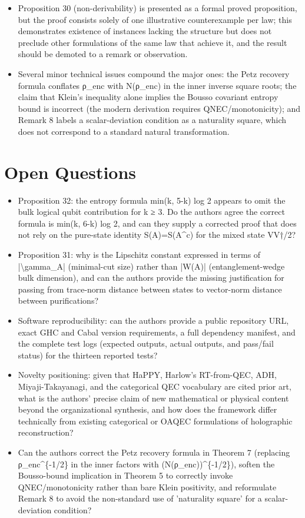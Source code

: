 \documentclass[11pt]{article}
\begin{document}
\begin{itemize}[leftmargin=*]
  \item Proposition 30 (non-derivability) is presented as a formal proved proposition, but the proof consists solely of one illustrative counterexample per law; this demonstrates existence of instances lacking the structure but does not preclude other formulations of the same law that achieve it, and the result should be demoted to a remark or observation.
  \item Several minor technical issues compound the major ones: the Petz recovery formula conflates ρ\_enc with N(ρ\_enc) in the inner inverse square roots; the claim that Klein's inequality alone implies the Bousso covariant entropy bound is incorrect (the modern derivation requires QNEC/monotonicity); and Remark 8 labels a scalar-deviation condition as a naturality square, which does not correspond to a standard natural transformation.
\end{itemize}

\section*{Open Questions}
\begin{itemize}[leftmargin=*]
  \item Proposition 32: the entropy formula min(k, 5-k) log 2 appears to omit the bulk logical qubit contribution for k ≥ 3. Do the authors agree the correct formula is min(k, 6-k) log 2, and can they supply a corrected proof that does not rely on the pure-state identity S(A)=S(A\^{}c) for the mixed state VV†/2?
  \item Proposition 31: why is the Lipschitz constant expressed in terms of |\textbackslash{}gamma\_A| (minimal-cut size) rather than |W(A)| (entanglement-wedge bulk dimension), and can the authors provide the missing justification for passing from trace-norm distance between states to vector-norm distance between purifications?
  \item Software reproducibility: can the authors provide a public repository URL, exact GHC and Cabal version requirements, a full dependency manifest, and the complete test logs (expected outputs, actual outputs, and pass/fail status) for the thirteen reported tests?
  \item Novelty positioning: given that HaPPY, Harlow's RT-from-QEC, ADH, Miyaji-Takayanagi, and the categorical QEC vocabulary are cited prior art, what is the authors' precise claim of new mathematical or physical content beyond the organizational synthesis, and how does the framework differ technically from existing categorical or OAQEC formulations of holographic reconstruction?
  \item Can the authors correct the Petz recovery formula in Theorem 7 (replacing ρ\_enc\^{}\{-1/2\} in the inner factors with (N(ρ\_enc))\^{}\{-1/2\}), soften the Bousso-bound implication in Theorem 5 to correctly invoke QNEC/monotonicity rather than bare Klein positivity, and reformulate Remark 8 to avoid the non-standard use of 'naturality square' for a scalar-deviation condition?
\end{itemize}
\end{document}
